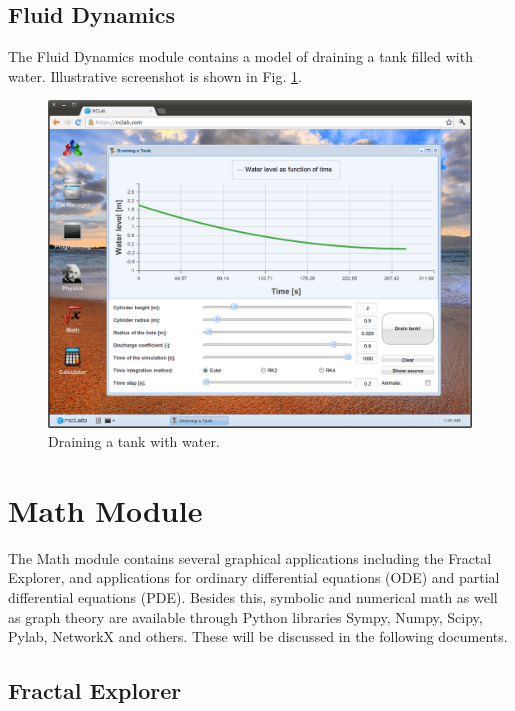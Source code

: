 \documentclass[article,A4,12pt]{llncs}
\begin{document}
\subsection{Fluid Dynamics}

The Fluid Dynamics module contains a model of draining a tank filled with water. 
Illustrative screenshot is shown in Fig. \ref{fig:tank1}.

\newpage

\begin{figure}[!ht]
\begin{center}
\includegraphics[width=\textwidth]{img/tank1.png}
\end{center}
\caption{Draining a tank with water.}
\label{fig:tank1}
\end{figure}



\section{Math Module}

The Math module contains several graphical applications including the Fractal 
Explorer, and applications for ordinary differential equations (ODE) and partial 
differential equations (PDE). Besides this, symbolic and numerical math 
as well as graph theory are available through Python libraries Sympy,
Numpy, Scipy, Pylab, NetworkX and others. These will be discussed in the following 
documents.

\subsection{Fractal Explorer}
\end{document}
